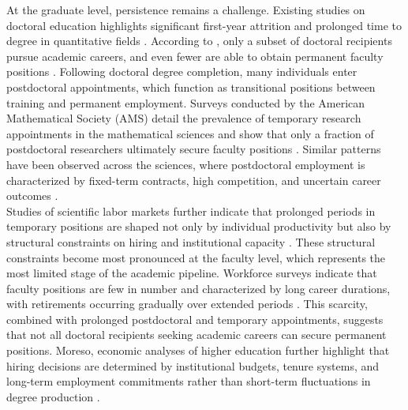 \documentclass[3p]{elsarticle}%
\theoremstyle{definition}
\begin{document}
 \noindent At the graduate level, persistence remains a challenge. Existing studies on doctoral education highlights significant first-year attrition and prolonged time to degree in quantitative fields \cite{golde1998beginning,NSFtimeToDegree}. According to \cite{cleary20102009}, only a subset of doctoral recipients pursue academic careers, and even fewer are able to obtain permanent faculty positions . Following doctoral degree completion, many individuals enter postdoctoral appointments, which function as transitional positions between training and permanent employment. Surveys conducted by the American Mathematical Society (AMS) detail the prevalence of temporary research appointments in the mathematical sciences and show that only a fraction of postdoctoral researchers ultimately secure faculty positions \cite{AMSworkforceReports}. Similar patterns have been observed across the sciences, where postdoctoral employment is characterized by fixed-term contracts, high competition, and uncertain career outcomes \cite{XueLarson2015}.\\
 
 \noindent Studies of scientific labor markets further indicate that prolonged periods in temporary positions are shaped not only by individual productivity but also by structural constraints on hiring and institutional capacity \cite{stephan2015economics}. These structural constraints become most pronounced at the faculty level, which represents the most limited stage of the academic pipeline. Workforce surveys indicate that faculty positions are few in number and characterized by long career durations, with retirements occurring gradually over extended periods \cite{AMSworkforceReports}. This scarcity, combined with prolonged postdoctoral and temporary appointments, suggests that not all doctoral recipients seeking academic careers can secure permanent positions. Moreso, economic analyses of higher education further highlight that hiring decisions are determined by institutional budgets, tenure systems, and long-term employment commitments rather than short-term fluctuations in degree production \cite{ehrenberg2012american}. \\
 
\end{document}
